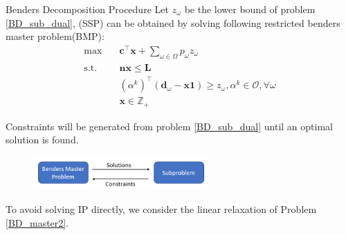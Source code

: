 \begin{frame}{Benders Decomposition Procedure}
  \small
  Let $z_{\omega}$ be the lower bound of problem \eqref{BD_sub_dual}, (SSP) can be obtained by solving following restricted benders master problem(BMP):
  \begin{equation}\label{BD_master2}
    \begin{aligned}
      \max \quad & \mathbf{c}^{\intercal} \mathbf{x} + \sum_{\omega \in \Omega} p_{\omega} z_{\omega} \\
      \text {s.t.} \quad & \mathbf{n} \mathbf{x} \leq \mathbf{L} \\
      & (\alpha^{k})^{\intercal}(\mathbf{d}_{\omega}- \mathbf{x} \mathbf{1}) \geq z_{\omega}, \alpha^k \in \mathcal{O}, \forall \omega \\
       & \mathbf{x} \in \mathbb{Z}_{+}
    \end{aligned}
  \end{equation} 

  Constraints will be generated from problem \eqref{BD_sub_dual} until an optimal solution is found.

  \begin{figure}[ht]
    \centering
    \includegraphics[width = 0.6\textwidth]{./images/BD.png}
  \end{figure}

  To avoid solving IP directly, we consider the linear relaxation of Problem \eqref{BD_master2}.
\end{frame}


